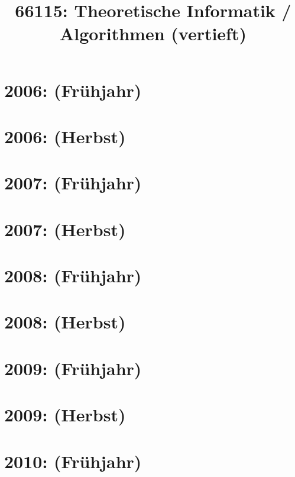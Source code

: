 \documentclass{lehramt-informatik-haupt}
\title{66115: Theoretische Informatik / Algorithmen (vertieft)}
\begin{document}
\maketitle
\tableofcontents

\section{2006: (Frühjahr)}


\section{2006: (Herbst)}


\section{2007: (Frühjahr)}


\section{2007: (Herbst)}


\section{2008: (Frühjahr)}


\section{2008: (Herbst)}


\section{2009: (Frühjahr)}


\section{2009: (Herbst)}


\section{2010: (Frühjahr)}

\end{document}
